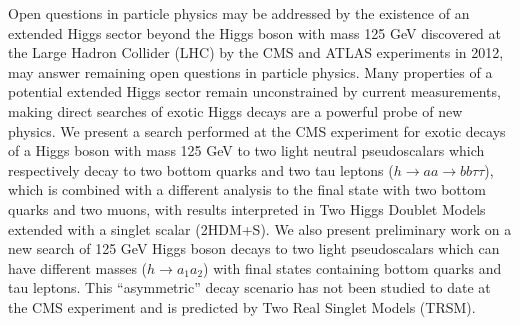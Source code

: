 Open questions in particle physics may be addressed by the existence of an extended Higgs sector beyond the Higgs boson with mass 125 GeV discovered at the Large Hadron Collider (LHC) by the CMS and ATLAS experiments in 2012, may answer remaining open questions in particle physics. Many properties of a potential extended Higgs sector remain unconstrained by current measurements, making direct searches of exotic Higgs decays are a powerful probe of new physics. We present a search performed at the CMS experiment for exotic decays of a Higgs boson with mass 125 GeV to two light neutral pseudoscalars which respectively decay to two bottom quarks and two tau leptons ($h\rightarrow aa \rightarrow bb\tau\tau$), which is combined with a different analysis to the final state with two bottom quarks and two muons, with results interpreted in Two Higgs Doublet Models extended with a singlet scalar (2HDM+S). We also present preliminary work on a new search of 125 GeV Higgs boson decays to two light pseudoscalars which can have different masses ($h \rightarrow a_1 a_2$) with final states containing bottom quarks and tau leptons. This ``asymmetric'' decay scenario has not been studied to date at the CMS experiment and is predicted by Two Real Singlet Models (TRSM).